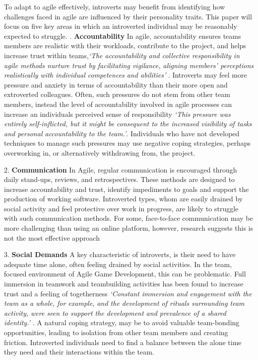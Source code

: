 \documentclass{scrartcl}
\begin{document}
To adapt to agile effectively, introverts may benefit from identifying how challenges faced in agile are influenced by their personality traits. This paper will focus on five key areas in which an introverted individual may be reasonably expected to struggle. 
\newline
{}.	\textbf{Accountability} \newline
In agile, accountability ensures teams members are realistic with their workloads, contribute to the project, and helps increase trust within teams,\textit{`The accountability and collective responsibility in agile methods nurture trust by facilitating vigilance, aligning members' perceptions realistically with individual competences and abilities'} \cite{McHughConboyLang}. Introverts may feel more pressure and anxiety in terms of accountability than their more open and extroverted colleagues. Often, such pressures do not stem from other team members, instead the level of accountability involved in agile processes can increase an individuals perceived sense of responsibility \textit{`This pressure was entirely self-inflicted, but it might be consequent to the increased visibility of tasks and personal accountability to the team.'}\cite{McHughConboyLang}. Individuals who have not developed techniques to manage such pressures may use negative coping strategies, perhaps overworking in, or alternatively withdrawing from, the project.

2.	\textbf{Communication} \newline
In Agile, regular communication is encouraged through daily stand-ups, reviews, and retrospectives.  These methods are designed to increase accountability and trust, identify impediments to goals and support the production of working software. Introverted types, whom are easily drained by social activity and feel protective over work in progress, are likely to struggle with such communication methods. For some, face-to-face communication may be more challenging than using an online platform, however, research suggests this is not the most effective approach

3.	\textbf{Social Demands} \newline
A key characteristic of introverts, is their need to have adequate time alone, often feeling drained by social activities. In the team, focused environment of Agile Game Development, this can be problematic. Full immersion in teamwork and teambuilding activities has been found to increase trust and a feeling of togetherness \textit{`Constant immersion and engagement with the team as a whole, for example, and the development of rituals surrounding team activity, were seen to support the development and prevalence of a shared identity.'} \cite{WhitworthBiddle}. A natural coping strategy, may be to avoid valuable team-bonding opportunities, leading to isolation from other team members and creating friction. Introverted individuals need to find a balance between the alone time they need and their interactions within the team.
\end{document}
